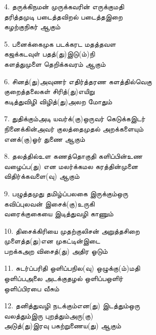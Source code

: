   4. தருக்கிநமன் முருக்கவரின் எருக்குமதி\\
         தரித்தமுடி படைத்தவிறல் படைத்தஇறை\\
         கழற்குநிகர் ஆகும் \thiru



  5. பனைக்கைமுக படக்கரட மதத்தவள\\
         கஜக்கடவுள் பதத்(து)இடு(ம்)நி\\
         களத்துமுளை தெறிக்கவரம் ஆகும் \thiru



  6. சினத்(து)அவுணர் எதிர்த்தரண களத்தில்வெகு\\
         குறைத்தலைகள் சிரித்(து)எயிறு\\
         கடித்துவிழி விழித்(து)அலற மோதும் \thiru



  7. துதிக்கும்அடி யவர்க்(கு)ஒருவர் கெடுக்கஇடர்\\
         நினைக்கின்அவர் குலத்தைமுதல் அறக்களையும்\\
         எனக்(கு)ஓர் துணை ஆகும் \thiru



  8. தலத்தில்உள கணத்தொகுதி களிப்பின்உண\\
         வழைப்ப(து) என மலர்க்கமல கரத்தின்முனை\\
         விதிர்க்கவளை(வு) ஆகும் \thiru



  9. பழுத்தமுது தமிழ்ப்பலகை இருக்கும்ஒரு\\
         கவிப்புலவன் இசைக்(கு)உருகி\\
         வரைக்குகையை இடித்துவழி காணும் \thiru



10. திசைக்கிரியை முதற்குலிசன் அறுத்தசிறை\\
         முளைத்த(து)என முகட்டின்இடை\\
         பறக்கஅற விசைத்(து) அதிர ஓடும் \thiru



11. சுடர்ப்பரிதி ஒளிப்பநில(வு) ஒழுக்கு(ம்)மதி\\
         ஒளிப்பஅலை அடக்குதழல் ஒளிப்பஒளிர்\\
         ஒளிப்பிரபை வீசும் \thiru



12. தனித்துவழி நடக்கும்என(து) இடத்தும்ஒரு\\
         வலத்தும்இரு புறத்தும்அரு(கு)\\
         அடுத்(து)இரவு பகற்றுணைய(து) ஆகும் \thiru



